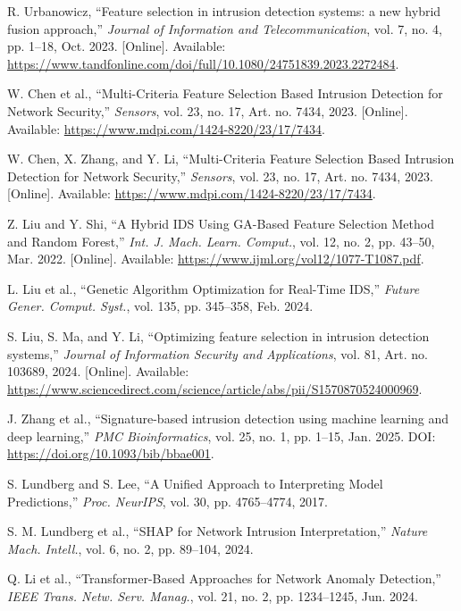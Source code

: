 \documentclass[conference]{IEEEtran}
\begin{document}
\begin{thebibliography}{00}
R. Urbanowicz, ``Feature selection in intrusion detection systems: a new hybrid fusion approach,'' \textit{Journal of Information and Telecommunication}, vol. 7, no. 4, pp. 1--18, Oct. 2023. [Online]. Available: \url{https://www.tandfonline.com/doi/full/10.1080/24751839.2023.2272484}.

W. Chen et al., ``Multi-Criteria Feature Selection Based Intrusion Detection for Network Security,'' \textit{Sensors}, vol. 23, no. 17, Art. no. 7434, 2023. [Online]. Available: \url{https://www.mdpi.com/1424-8220/23/17/7434}.

W. Chen, X. Zhang, and Y. Li, ``Multi-Criteria Feature Selection Based Intrusion Detection for Network Security,'' \textit{Sensors}, vol. 23, no. 17, Art. no. 7434, 2023. [Online]. Available: \url{https://www.mdpi.com/1424-8220/23/17/7434}.

Z. Liu and Y. Shi, ``A Hybrid IDS Using GA-Based Feature Selection Method and Random Forest,'' \textit{Int. J. Mach. Learn. Comput.}, vol. 12, no. 2, pp. 43--50, Mar. 2022. [Online]. Available: \url{https://www.ijml.org/vol12/1077-T1087.pdf}.

L. Liu et al., ``Genetic Algorithm Optimization for Real-Time IDS,'' \textit{Future Gener. Comput. Syst.}, vol. 135, pp. 345--358, Feb. 2024.

S. Liu, S. Ma, and Y. Li, ``Optimizing feature selection in intrusion detection systems,'' \textit{Journal of Information Security and Applications}, vol. 81, Art. no. 103689, 2024. [Online]. Available: \url{https://www.sciencedirect.com/science/article/abs/pii/S1570870524000969}.

J. Zhang et al., ``Signature-based intrusion detection using machine learning and deep learning,'' \textit{PMC Bioinformatics}, vol. 25, no. 1, pp. 1--15, Jan. 2025. DOI: \url{https://doi.org/10.1093/bib/bbae001}.

S. Lundberg and S. Lee, ``A Unified Approach to Interpreting Model Predictions,'' \textit{Proc. NeurIPS}, vol. 30, pp. 4765--4774, 2017.

S. M. Lundberg et al., ``SHAP for Network Intrusion Interpretation,'' \textit{Nature Mach. Intell.}, vol. 6, no. 2, pp. 89--104, 2024.

Q. Li et al., ``Transformer-Based Approaches for Network Anomaly Detection,'' \textit{IEEE Trans. Netw. Serv. Manag.}, vol. 21, no. 2, pp. 1234--1245, Jun. 2024.


\end{thebibliography}
\end{document}
